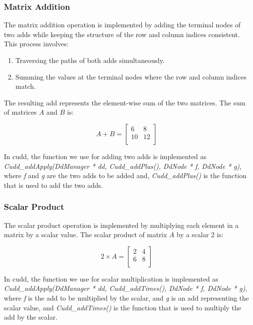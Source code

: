 \subsubsection{Matrix Addition}
The matrix addition operation is implemented by adding the terminal nodes of two \glspl{add} while keeping the structure of the row and column indices consistent.
This process involves:

\begin{enumerate}
    \item Traversing the paths of both \glspl{add} simultaneously.
    \item Summing the values at the terminal nodes where the row and column indices match.
\end{enumerate}

The resulting \gls{add} represents the element-wise sum of the two matrices.
The sum of matrices $A$ and $B$ is:

\[
    A + B = \begin{bmatrix}
                6  & 8  \\
                10 & 12 \\
    \end{bmatrix}
\]

In \gls{cudd}, the function we use for adding two \glspl{add} is implemented as \textit{Cudd\_addApply(DdManager * dd, Cudd\_addPlus(), DdNode * f, DdNode * g)}, where \textit{f} and \textit{g} are the two \glspl{add} to be added and, \textit{Cudd\_addPlus()} is the function that is used to add the two \glspl{add}.

\subsubsection{Scalar Product}
The scalar product operation is implemented by multiplying each element in a matrix by a scalar value.
The scalar product of matrix $A$ by a scalar 2 is:

\[
    2 \times A = \begin{bmatrix}
                     2 & 4 \\
                     6 & 8 \\
    \end{bmatrix}
\]

In \gls{cudd}, the function we use for scalar multiplication is implemented as \textit{Cudd\_addApply(DdManager * dd, Cudd\_addTimes(), DdNode * f, DdNode * g)}, where \textit{f} is the \gls{add} to be multiplied by the scalar, and \textit{g} is an \gls{add} representing the scalar value, and \textit{Cudd\_addTimes()} is the function that is used to multiply the \gls{add} by the scalar.

